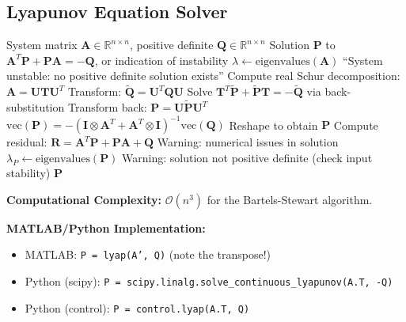 \subsection{Lyapunov Equation Solver}

\begin{algorithm}[H]
\caption{Continuous-Time Lyapunov Equation Solver}
\label{alg:lyapunov_eq}
\begin{algorithmic}[1]
\REQUIRE System matrix $\mathbf{A} \in \mathbb{R}^{n \times n}$, positive definite $\mathbf{Q} \in \mathbb{R}^{n \times n}$
\ENSURE Solution $\mathbf{P}$ to $\mathbf{A}^T\mathbf{P} + \mathbf{P}\mathbf{A} = -\mathbf{Q}$, or indication of instability
\STATE
\STATE {}
\STATE $\lambda \gets \text{eigenvalues}(\mathbf{A})$
    \RETURN ``System unstable: no positive definite solution exists''
\ENDIF
\STATE
\STATE {}
\STATE Compute real Schur decomposition: $\mathbf{A} = \mathbf{U}\mathbf{T}\mathbf{U}^T$
\STATE Transform: $\tilde{\mathbf{Q}} = \mathbf{U}^T\mathbf{Q}\mathbf{U}$
\STATE Solve $\mathbf{T}^T\tilde{\mathbf{P}} + \tilde{\mathbf{P}}\mathbf{T} = -\tilde{\mathbf{Q}}$ via back-substitution
\STATE Transform back: $\mathbf{P} = \mathbf{U}\tilde{\mathbf{P}}\mathbf{U}^T$
\STATE
\STATE {}
\STATE $\text{vec}(\mathbf{P}) = -(\mathbf{I} \otimes \mathbf{A}^T + \mathbf{A}^T \otimes \mathbf{I})^{-1} \text{vec}(\mathbf{Q})$
\STATE Reshape to obtain $\mathbf{P}$
\STATE
\STATE {}
\STATE Compute residual: $\mathbf{R} = \mathbf{A}^T\mathbf{P} + \mathbf{P}\mathbf{A} + \mathbf{Q}$
    \STATE Warning: numerical issues in solution
\ENDIF
\STATE
\STATE {}
\STATE $\lambda_P \gets \text{eigenvalues}(\mathbf{P})$
    \STATE Warning: solution not positive definite (check input stability)
\ENDIF
\STATE
\RETURN $\mathbf{P}$
\end{algorithmic}
\end{algorithm}

\textbf{Computational Complexity:} $\mathcal{O}(n^3)$ for the Bartels-Stewart algorithm.

\textbf{MATLAB/Python Implementation:}
\begin{itemize}
    \item MATLAB: \texttt{P = lyap(A', Q)} (note the transpose!)
    \item Python (scipy): \texttt{P = scipy.linalg.solve\_continuous\_lyapunov(A.T, -Q)}
    \item Python (control): \texttt{P = control.lyap(A.T, Q)}
\end{itemize}


